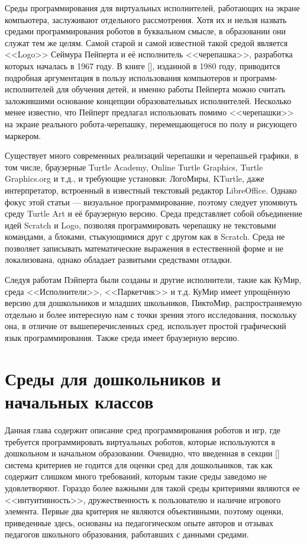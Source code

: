 \documentclass[a5paper]{article}
\begin{document}
Среды программирования для виртуальных исполнителей, работающих на экране компьютера, заслуживают отдельного 
рассмотрения. Хотя их и нельзя назвать средами программирования роботов в буквальном смысле, в образовании 
они служат тем же целям. Самой старой и самой известной такой средой является <<Logo>> Сеймура Пейперта и 
её исполнитель <<черепашка>>, разработка которых началась в 1967 году. В книге [], изданной в 1980 году, 
приводится подробная аргументация в пользу использования компьютеров и программ-исполнителей для обучения 
детей, и именно работы Пейперта можно считать заложившими основание концепции образовательных исполнителей. 
Несколько менее известно, что Пейперт предлагал использовать помимо <<черепашки>> на экране реального робота-черепашку, 
перемещающегося по полу и рисующего маркером.

Существует много современных реализаций черепашки и черепашьей графики, в том числе, браузерные Turtle Academy, 
Online Turtle Graphics, Turtle Graphics.org и т.д., и требующие установки: ЛогоМиры, KTurtle, даже интерпретатор, 
встроенный в известный текстовый редактор LibreOffice. Однако фокус этой статьи --- визуальное программирование, 
поэтому следует упомянуть среду Turtle Art и её браузерную версию. Среда представляет собой объединение 
идей Scratch и Logo, позволяя программировать черепашку не текстовыми командами, а блоками, стыкующимися друг 
с другом как в Scratch. Среда не позволяет записывать математические выражения в естественной форме и 
не локализована, однако обладает развитыми средствами отладки.

Следуя работам Пэйперта были созданы и другие исполнители, такие как КуМир, среда <<Исполнители>>, <<Паркетчик>> и т.д. 
КуМир имеет упрощённую версию для дошкольников и младших школьников, ПиктоМир, распространяемую отдельно и более 
интересную нам  с точки зрения этого исследования, поскольку она, в отличие от вышеперечисленных сред, использует 
простой графический язык программирования. Также среда имеет браузерную версию.

\section{Среды для дошкольников и начальных классов}

Данная глава содержит описание сред программирования роботов и игр, где требуется программировать виртуальных роботов, 
которые используются в дошкольном и начальном образовании. Очевидно, что введенная в секции [] система критериев 
не годится для оценки сред для дошкольников, так как содержит слишком много требований, которым такие среды 
заведомо не удовлетворяют. Гораздо более важными для такой среды критериями являются ее <<интуитивность>>, 
дружественность к пользователю и наличие игрового элемента. Первые два критерия не являются объективными, поэтому оценки, 
приведенные здесь, основаны на педагогическом опыте авторов и отзывах педагогов школьного образования, 
работавших с данными средами.
\end{document}
